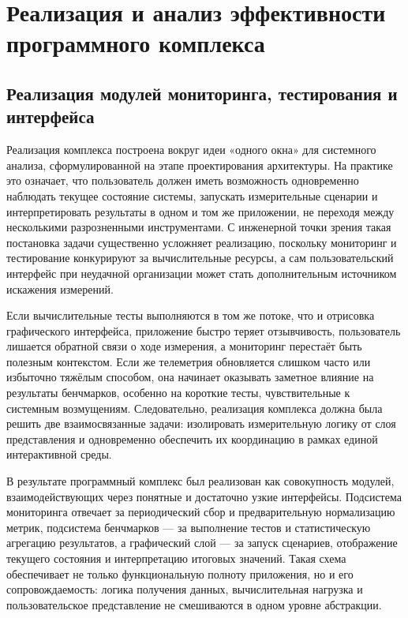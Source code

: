 \chapter{Реализация и анализ эффективности программного комплекса}
\label{ch:implementation}

\section{Реализация модулей мониторинга, тестирования и интерфейса}

Реализация комплекса построена вокруг идеи «одного окна» для системного анализа, сформулированной на этапе проектирования архитектуры. На практике это означает, что пользователь должен иметь возможность одновременно наблюдать текущее состояние системы, запускать измерительные сценарии и интерпретировать результаты в одном и том же приложении, не переходя между несколькими разрозненными инструментами. С инженерной точки зрения такая постановка задачи существенно усложняет реализацию, поскольку мониторинг и тестирование конкурируют за вычислительные ресурсы, а сам пользовательский интерфейс при неудачной организации может стать дополнительным источником искажения измерений.

Если вычислительные тесты выполняются в том же потоке, что и отрисовка графического интерфейса, приложение быстро теряет отзывчивость, пользователь лишается обратной связи о ходе измерения, а мониторинг перестаёт быть полезным контекстом. Если же телеметрия обновляется слишком часто или избыточно тяжёлым способом, она начинает оказывать заметное влияние на результаты бенчмарков, особенно на короткие тесты, чувствительные к системным возмущениям. Следовательно, реализация комплекса должна была решить две взаимосвязанные задачи: изолировать измерительную логику от слоя представления и одновременно обеспечить их координацию в рамках единой интерактивной среды.

В результате программный комплекс был реализован как совокупность модулей, взаимодействующих через понятные и достаточно узкие интерфейсы. Подсистема мониторинга отвечает за периодический сбор и предварительную нормализацию метрик, подсистема бенчмарков --- за выполнение тестов и статистическую агрегацию результатов, а графический слой --- за запуск сценариев, отображение текущего состояния и интерпретацию итоговых значений. Такая схема обеспечивает не только функциональную полноту приложения, но и его сопровождаемость: логика получения данных, вычислительная нагрузка и пользовательское представление не смешиваются в одном уровне абстракции.

